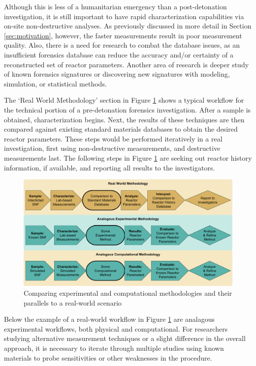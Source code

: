 Although this is less of a humanitarian emergency than a post-detonation
investigation, it is still important to have rapid characterization
capabilities via on-site non-destructive analyses.  As previously discussed in
more detail in Section \ref{sec:motivation}, however, the faster measurements
result in poor measurement quality. Also, there is a need for research to
combat the database issues, as an insufficient forensics database can reduce
the accuracy and/or certainty of a reconstructed set of reactor parameters.
Another area of research is deeper study of known forensics signatures or
discovering new signatures with modeling, simulation, or statistical methods. 

The `Real World Methodology' section in Figure \ref{fig:nfworkflow} shows a
typical workflow for the technical portion of a pre-detonation forensics
investigation.  After a sample is obtained, characterization begins.  Next, the
results of these techniques are then compared against existing standard
materials databases to obtain the desired reactor parameters. These steps would
be performed iteratively in a real investigation, first using non-destructive
measurements, and destructive measurements last.  The following steps in Figure
\ref{fig:nfworkflow} are seeking out reactor history information, if available,
and reporting all results to the investigators. 
\\
\begin{figure}[!h]
  \includegraphics[width=\linewidth]{./chapters/intro/ForensicsWorkflows.png}
  \caption{Comparing experimental and computational methodologies and their parallels to a real-world scenario}
  \label{fig:nfworkflow}
\end{figure}

Below the example of a real-world workflow in Figure \ref{fig:nfworkflow} are
analagous experimental workflows, both physical and computational.  
For researchers studying
alternative measurement techniques or a slight difference in the overall
approach, it is necessary to iterate through multiple studies using known
materials to probe sensitivities or other weaknesses in the procedure.


